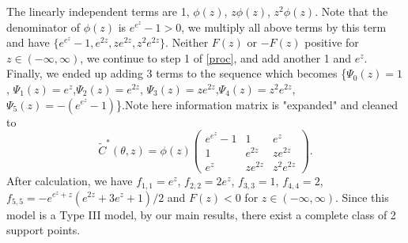 \documentclass[11pt]{amsart}
\theoremstyle{definition}
\theoremstyle{remark}
\begin{document}
The linearly independent terms are 1, $\phi(z)$, $z\phi(z)$, $z^2\phi(z)$. Note that the denominator of $\phi(z)$ is $e^{e^z}-1>0$, we multiply all above terms by this term and have $\{e^{e^z}-1,e^{2z}, ze^{2z}, z^2e^{2z}\}$. Neither $ F(z)$ or $ -F(z)$ positive for $z\in (-\infty,\infty)$, we continue to step 1 of \ref{proc}, and add another 1 and $e^z$. Finally, we ended up adding 3 terms to the sequence which becomes \{$\Psi_0(z) = 1$, $\Psi_1(z) = e^z$,$\Psi_2(z) = e^{2z}$,  $\Psi_3(z) = ze^{2z}$,$\Psi_4(z) = z^2e^{2z}$, $\Psi_5(z) = -(e^{e^z}-1)$\}.Note here information matrix is "expanded" and cleaned to  \[ \tilde{C}^*(\theta,z) = \phi(z)\left(\begin{array}{ccc}
e^{e^z}-1&1&e^{z}\\
1&e^{2z} & ze^{2z}\\
e^z& ze^{2z} & z^2e^{2z}
\end{array} \right).\] After calculation, we have $f_{1,1} = e^z$, $f_{2,2} =2e^z$, $f_{3,3} = 1$, $f_{4,4} = 2$, $f_{5,5} =- e^{e^z+z}(e^{2z}+3e^z+1)/2$ and $F(z)<0$ for $z\in(-\infty,\infty)$. Since this model is a Type III model, by our main results, there exist a complete class of 2 support points. \\

\end{document}
